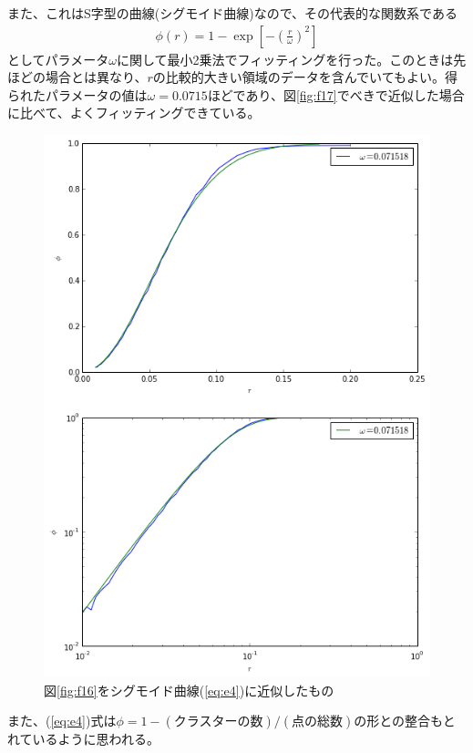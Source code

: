 また、これはS字型の曲線(シグモイド曲線)なので、その代表的な関数系である
\begin{eqnarray}\phi (r) = 1 - \exp \left[ -  \left( \frac{r}{\omega} \right)^{2} \right]\label{eq:e4}
\end{eqnarray}
としてパラメータ$\omega$に関して最小2乗法でフィッティングを行った。このときは先ほどの場合とは異なり、$r$の比較的大きい領域のデータを含んでいてもよい。得られたパラメータの値は$\omega=0.0715$ほどであり、図\ref{fig:f17}でべきで近似した場合に比べて、よくフィッティングできている。
\begin{figure}[H]
    \begin{center}
        \includegraphics[width=12.5cm]{../img/r_phi_1_sigmoid.png}
        \caption{図\ref{fig:f16}をシグモイド曲線(\ref{eq:e4})に近似したもの}
        \label{fig:f18}
    \end{center}
\end{figure}
また、(\ref{eq:e4})式は$\phi = 1- (\text{クラスターの数})/(\text{点の総数})$の形との整合もとれているように思われる。






